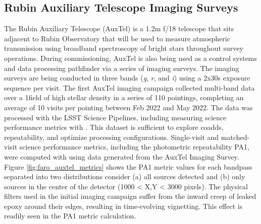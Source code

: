 \subsection{Rubin Auxiliary Telescope Imaging Surveys} \label{ssec:auxtel}

The Rubin Auxiliary Telescope\cite{10.1117/12.2561112} (AuxTel) is a 1.2m f/18 telescope that sits adjacent to Rubin Observatory that will be used to measure atmospheric transmission using broadband spectroscopy of bright stars throughout survey operations. 
During commissioning, AuxTel is also being used as a control systems and data processing pathfinder via a series of imaging surveys. The imaging surveys are being conducted in three bands (\emph{g}, \emph{r}, and \emph{i}) using a 2x30s exposure sequence per visit.
The first AuxTel imaging campaign collected multi-band data over a 1\degsq field of high stellar density in a series of 110 pointings, completing an average of 10 visits per pointing between Feb 2022 and May 2022. The data was processed with the LSST Science Pipelines, including measuring science performance metrics with \faro. This dataset is sufficient to explore coadds, repeatability, and optimize processing configurations.
Single-visit and matched-visit science performance metrics, including the photometric repeatability PA1, were computed with \faro using data generated from the AuxTel Imaging Survey.
Figure \ref{fig:faro_auxtel_metrics} shows the PA1 metric values for each bandpass separated into two distributions consider (a) all sources detected and (b) only sources in the center of the detector (1000 < X,Y < 3000 pixels). The physical filters used in the initial imaging campaign suffer from the inward creep of leaked epoxy around their edges, resulting in time-evolving vignetting. This effect is readily seen in the PA1 metric calculation.

